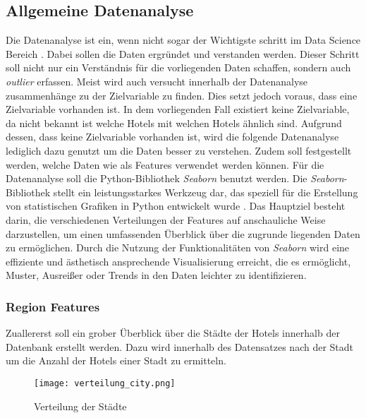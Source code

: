 \subsection{Allgemeine Datenanalyse}
\label{subsec:Datenanalyse}
Die Datenanalyse ist ein, wenn nicht sogar der Wichtigste schritt im Data Science Bereich \cite{Agarwal.05.10.2018}. Dabei sollen die Daten ergründet und verstanden werden. Dieser Schritt soll nicht nur ein Verständnis für die vorliegenden Daten schaffen, sondern auch \emph{outlier} erfassen. Meist wird auch versucht innerhalb der Datenanalyse zusammenhänge zu der Zielvariable zu finden. Dies setzt jedoch voraus, dass eine Zielvariable vorhanden ist. In dem vorliegenden Fall existiert keine Zielvariable, da nicht bekannt ist welche Hotels mit welchen Hotels ähnlich sind. Aufgrund dessen, dass keine Zielvariable vorhanden ist, wird die folgende Datenanalyse lediglich dazu genutzt um die Daten besser zu verstehen. Zudem soll festgestellt werden, welche Daten wie als Features verwendet werden können.
\newline
\newline
Für die Datenanalyse soll die Python-Bibliothek \emph{Seaborn} benutzt werden. Die \emph{Seaborn}-Bibliothek stellt ein leistungsstarkes Werkzeug dar, das speziell für die Erstellung von statistischen Grafiken in Python entwickelt wurde \cite{Melanie.2023}. Das Hauptziel besteht darin, die verschiedenen Verteilungen der Features auf anschauliche Weise darzustellen, um einen umfassenden Überblick über die zugrunde liegenden Daten zu ermöglichen. Durch die Nutzung der Funktionalitäten von \emph{Seaborn} wird eine effiziente und ästhetisch ansprechende Visualisierung erreicht, die es ermöglicht, Muster, Ausreißer oder Trends in den Daten leichter zu identifizieren.

\subsubsection{Region Features}
Zuallererst soll ein grober Überblick über die Städte der Hotels innerhalb der Datenbank erstellt werden. Dazu wird innerhalb des Datensatzes nach der Stadt um die Anzahl der Hotels einer Stadt zu ermitteln.

\newpage

\begin{figure}[h]
    \centering
    \texttt{[image: verteilung\_city.png]}
    \caption[Verteilung der Städte]{Verteilung der Städte}
    \label{img:verteilung_city}
\end{figure}

